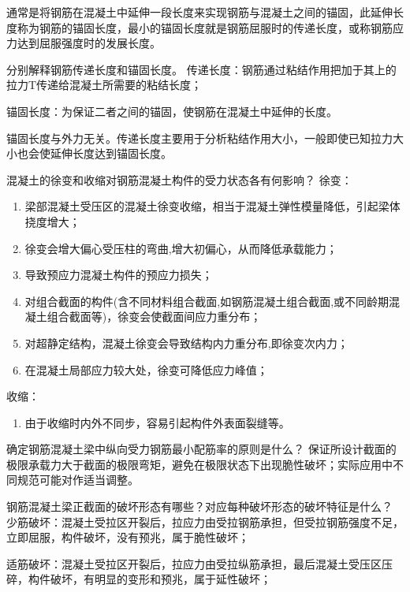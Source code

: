 \documentclass{article}
\begin{document}
\begin{questionList}
      \par 通常是将钢筋在混凝土中延伸一段长度来实现钢筋与混凝土之间的锚固，此延伸长度称为钢筋的锚固长度，最小的锚固长度就是钢筋屈服时的传递长度，或称钢筋应力达到屈服强度时的发展长度。
      \item 分别解释钢筋传递长度和锚固长度。
      \ans 传递长度：钢筋通过粘结作用把加于其上的拉力T传递给混凝土所需要的粘结长度；
      \par ​锚固长度：为保证二者之间的锚固，使钢筋在混凝土中延伸的长度。
      \par 锚固长度与外力无关。传递长度主要用于分析粘结作用大小，一般即使已知拉力大小也会使延伸长度达到锚固长度。
      \item 混凝土的徐变和收缩对钢筋混凝土构件的受力状态各有何影响？
      \ans 徐变：
      \begin{enumerate}
            \item 梁部混凝土受压区的混凝土徐变收缩，相当于混凝土弹性模量降低，引起梁体挠度增大；
            \item 徐变会增大偏心受压柱的弯曲,增大初偏心，从而降低承载能力；
            \item 导致预应力混凝土构件的预应力损失；
            \item 对组合截面的构件(含不同材料组合截面,如钢筋混凝土组合截面,或不同龄期混凝土组合截面等)，徐变会使截面间应力重分布；
            \item 对超静定结构，混凝土徐变会导致结构内力重分布,即徐变次内力；
            \item 在混凝土局部应力较大处，徐变可降低应力峰值；
      \end{enumerate}
      \par 收缩：
      \begin{enumerate}
            \item 由于收缩时内外不同步，容易引起构件外表面裂缝等。
      \end{enumerate}
      \item 确定钢筋混凝土梁中纵向受力钢筋最小配筋率的原则是什么？
      \ans 保证所设计截面的极限承载力大于截面的极限弯矩，避免在极限状态下出现脆性破坏；实际应用中不同规范可能对作适当调整。
      \item 钢筋混凝土梁正截面的破坏形态有哪些？对应每种破坏形态的破坏特征是什么？
      \ans 少筋破坏：混凝土受拉区开裂后，拉应力由受拉钢筋承担，但受拉钢筋强度不足，立即屈服，构件破坏，没有预兆，属于脆性破坏；
      \par 适筋破坏：混凝土受拉区开裂后，拉应力由受拉纵筋承担，最后混凝土受压区压碎，构件破坏，有明显的变形和预兆，属于延性破坏；

\end{questionList}
\end{document}
